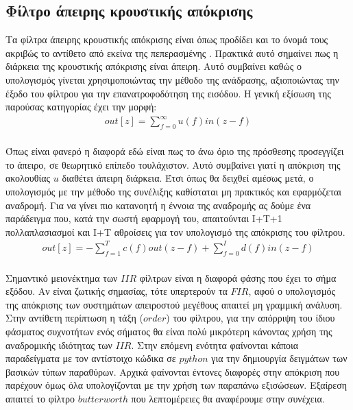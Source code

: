 \documentclass[breaklines=true, 12pt]{article}
\begin{document}
\subsection{Φίλτρο άπειρης κρουστικής απόκρισης}
\label{sec:org3a92071}
Τα φίλτρα άπειρης κρουστικής απόκρισης είναι όπως προδίδει και το όνομά τους
ακριβώς το αντίθετο από εκείνα της πεπερασμένης . Πρακτικά αυτό σημαίνει
πως η διάρκεια της κρουστικής απόκρισης είναι άπειρη. Αυτό συμβαίνει καθώς ο
υπολογισμός γίνεται χρησιμοποιώντας την μέθοδο της ανάδρασης, αξιοποιώντας την
έξοδο του φίλτρου για την επανατροφοδότηση της εισόδου. Η γενική εξίσωση της
παρούσας κατηγορίας έχει την μορφή:
\begin{equation}
\begin{align}
out[z] = \sum_{f=0}^{\infty}u(f)in(z-f) \\
\end{align}
\end{equation}

Όπως είναι φανερό η διαφορά εδώ είναι πως το άνω όριο της πρόσθεσης προσεγγίζει
το άπειρο, σε θεωρητικό επίπεδο τουλάχιστον. Αυτό συμβαίνει γιατί η απόκριση
της ακολουθίας \(u\) διαθέτει άπειρη διάρκεια. Έτσι όπως θα δειχθεί αμέσως μετά,
ο υπολογισμός με την μέθοδο της συνέλιξης καθίσταται μη πρακτικός και εφαρμόζεται
αναδρομή. Για να γίνει πιο κατανοητή η έννοια της αναδρομής ας δούμε ένα
παράδειγμα που, κατά την σωστή εφαρμογή του, απαιτούνται I+T+1
πολλαπλασιασμοί και I+T αθροίσεις για τον υπολογισμό της απόκρισης του φίλτρου.
\begin{equation}
\begin{align}
out[z] = - \sum_{f=1}^{T}c(f)out(z-f) + \sum_{f=0}^{I}d(f)in(z-f) \\
\end{align}
\end{equation}

Σημαντικό μειονέκτημα των \(IIR\) φίλτρων είναι η διαφορά φάσης που έχει το σήμα
εξόδου. Αν είναι ζωτικής σημασίας, τότε υπερτερούν τα \(FIR\), αφού ο υπολογισμός
της απόκρισης των συστημάτων απειροστού μεγέθους απαιτεί μη γραμμική ανάλυση.
Στην αντίθετη περίπτωση η τάξη (\(order\)) του φίλτρου, για την απόρριψη του ίδιου
φάσματος συχνοτήτων ενός σήματος θα είναι πολύ μικρότερη κάνοντας χρήση της
αναδρομικής ιδιότητας των \(IIR\). Στην επόμενη ενότητα φαίνονται κάποια παραδείγματα
με τον αντίστοιχο κώδικα σε \(python\) για την δημιουργία δειγμάτων των βασικών
τύπων παραθύρων. Αρχικά φαίνονται έντονες διαφορές στην απόκριση που παρέχουν
όμως όλα υπολογίζονται με την χρήση των παραπάνω εξισώσεων. Εξαίρεση απαιτεί
το φίλτρο \(butterworth\) που λεπτομέρειες θα αναφέρουμε στην συνέχεια.
\end{document}
